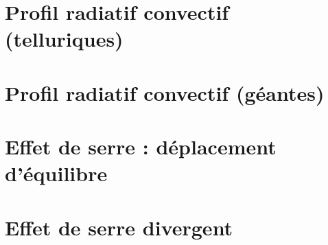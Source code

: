 \documentclass[a4paper,DIV16,10pt]{scrartcl}
\begin{document}
 \inidoc

%

\newpage
\section{Profil radiatif convectif (telluriques)}


\newpage
\section{Profil radiatif convectif (géantes)}


\newpage
\section{Effet de serre : déplacement d'équilibre}


\newpage
\section{Effet de serre divergent}


%

%
%
%
%
%
\end{document}
